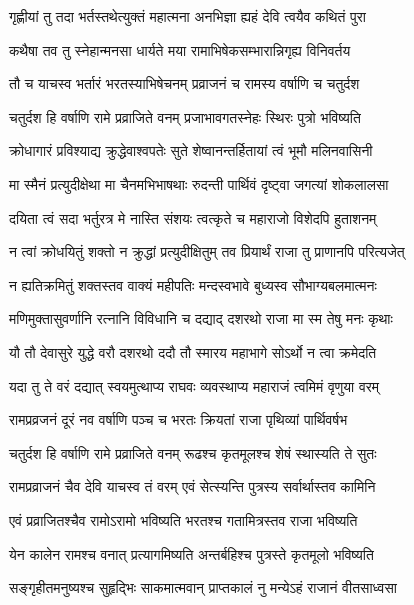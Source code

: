 \twolineshloka
{गृह्णीयां तु तदा भर्तस्तथेत्युक्तं महात्मना}
{अनभिज्ञा ह्यहं देवि त्वयैव कथितं पुरा} %

\twolineshloka
{कथैषा तव तु स्नेहान्मनसा धार्यते मया}
{रामाभिषेकसम्भारान्निगृह्य विनिवर्तय} %

\twolineshloka
{तौ च याचस्व भर्तारं भरतस्याभिषेचनम्}
{प्रव्राजनं च रामस्य वर्षाणि च चतुर्दश} %

\twolineshloka
{चतुर्दश हि वर्षाणि रामे प्रव्राजिते वनम्}
{प्रजाभावगतस्नेहः स्थिरः पुत्रो भविष्यति} %

\twolineshloka
{क्रोधागारं प्रविश्याद्य क्रुद्धेवाश्वपतेः सुते}
{शेष्वानन्तर्हितायां त्वं भूमौ मलिनवासिनी} %

\twolineshloka
{मा स्मैनं प्रत्युदीक्षेथा मा चैनमभिभाषथाः}
{रुदन्ती पार्थिवं दृष्ट्वा जगत्यां शोकलालसा} %

\twolineshloka
{दयिता त्वं सदा भर्तुरत्र मे नास्ति संशयः}
{त्वत्कृते च महाराजो विशेदपि हुताशनम्} %

\twolineshloka
{न त्वां क्रोधयितुं शक्तो न क्रुद्धां प्रत्युदीक्षितुम्}
{तव प्रियार्थं राजा तु प्राणानपि परित्यजेत्} %

\twolineshloka
{न ह्यतिक्रमितुं शक्तस्तव वाक्यं महीपतिः}
{मन्दस्वभावे बुध्यस्व सौभाग्यबलमात्मनः} %

\twolineshloka
{मणिमुक्तासुवर्णानि रत्नानि विविधानि च}
{दद्याद् दशरथो राजा मा स्म तेषु मनः कृथाः} %

\twolineshloka
{यौ तौ देवासुरे युद्धे वरौ दशरथो ददौ}
{तौ स्मारय महाभागे सोऽर्थो न त्वा क्रमेदति} %

\twolineshloka
{यदा तु ते वरं दद्यात् स्वयमुत्थाप्य राघवः}
{व्यवस्थाप्य महाराजं त्वमिमं वृणुया वरम्} %

\twolineshloka
{रामप्रव्रजनं दूरं नव वर्षाणि पञ्च च}
{भरतः क्रियतां राजा पृथिव्यां पार्थिवर्षभ} %

\twolineshloka
{चतुर्दश हि वर्षाणि रामे प्रव्राजिते वनम्}
{रूढश्च कृतमूलश्च शेषं स्थास्यति ते सुतः} %

\twolineshloka
{रामप्रव्राजनं चैव देवि याचस्व तं वरम्}
{एवं सेत्स्यन्ति पुत्रस्य सर्वार्थास्तव कामिनि} %

\twolineshloka
{एवं प्रव्राजितश्चैव रामोऽरामो भविष्यति}
{भरतश्च गतामित्रस्तव राजा भविष्यति} %

\twolineshloka
{येन कालेन रामश्च वनात् प्रत्यागमिष्यति}
{अन्तर्बहिश्च पुत्रस्ते कृतमूलो भविष्यति} %

\twolineshloka
{सङ्गृहीतमनुष्यश्च सुहृद्भिः साकमात्मवान्}
{प्राप्तकालं नु मन्येऽहं राजानं वीतसाध्वसा} %

